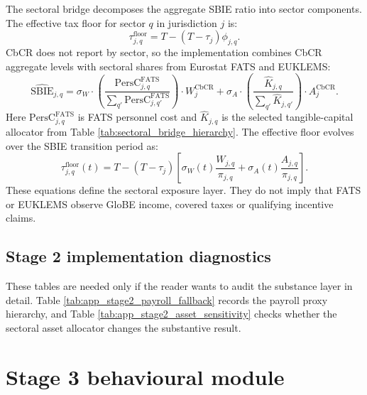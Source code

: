 \documentclass[11pt,a4paper]{article}
\begin{document}
The sectoral bridge decomposes the aggregate SBIE ratio into sector components. The effective tax floor for sector $q$ in jurisdiction $j$ is:
\begin{equation}\label{eq:floor_sector}
\tau_{j,q}^{\text{floor}} = T - (T-\tau_j)\phi_{j,q}.
\end{equation}
CbCR does not report by sector, so the implementation combines CbCR aggregate levels with sectoral shares from Eurostat FATS and EUKLEMS:
\begin{equation}\label{eq:sbie_sectoral}
\widehat{\text{SBIE}}_{j,q} = \sigma_W \cdot \left(\frac{\text{PersC}_{j,q}^{\text{FATS}}}{\sum_{q'} \text{PersC}_{j,q'}^{\text{FATS}}}\right) \cdot W_j^{\text{CbCR}} + \sigma_A \cdot \left(\frac{\hat{K}_{j,q}}{\sum_{q'} \hat{K}_{j,q'}}\right) \cdot A_j^{\text{CbCR}}.
\end{equation}
Here $\text{PersC}_{j,q}^{\text{FATS}}$ is FATS personnel cost and $\hat{K}_{j,q}$ is the selected tangible-capital allocator from Table \ref{tab:sectoral_bridge_hierarchy}. The effective floor evolves over the SBIE transition period as:
\begin{equation}\label{eq:floor_transition}
\tau_{j,q}^{\text{floor}}(t) = T - (T-\tau_j)\left[\sigma_W(t)\frac{W_{j,q}}{\pi_{j,q}} + \sigma_A(t)\frac{A_{j,q}}{\pi_{j,q}}\right].
\end{equation}
These equations define the sectoral exposure layer. They do not imply that FATS or EUKLEMS observe GloBE income, covered taxes or qualifying incentive claims.

\subsection{Stage 2 implementation diagnostics}\label{app:results_stage2}

These tables are needed only if the reader wants to audit the substance layer in detail. Table \ref{tab:app_stage2_payroll_fallback} records the payroll proxy hierarchy, and Table \ref{tab:app_stage2_asset_sensitivity} checks whether the sectoral asset allocator changes the substantive result.




\section{Stage 3 behavioural module}\label{app:stage3_behaviour}
\end{document}
